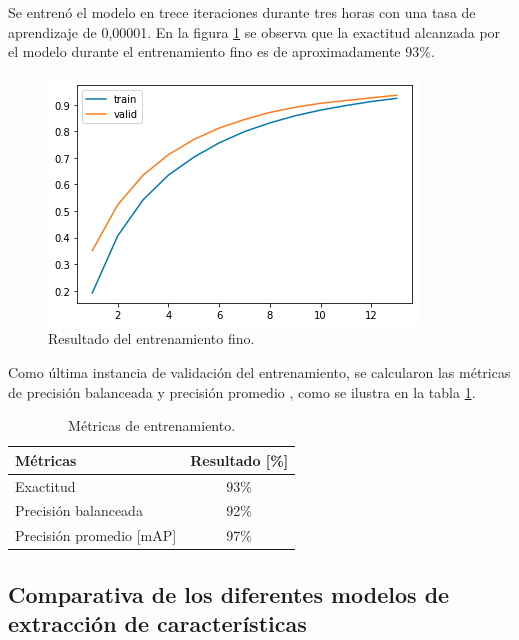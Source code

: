 Se entrenó el modelo en trece iteraciones durante tres horas con una tasa de aprendizaje de 0,00001. En la figura \ref{fig:entrenamientoFinoResultado} se observa que la exactitud alcanzada por el modelo durante el entrenamiento fino es de aproximadamente 93\%.

\begin{figure}[ht]
	\centering
	\includegraphics[scale=1.]{./Figures/entrenamientoFinoResultado.png}
	\caption{Resultado del entrenamiento fino.}
	\label{fig:entrenamientoFinoResultado}
\end{figure}

Como última instancia de validación del entrenamiento, se calcularon las métricas de precisión balanceada \citep{BalancedAccuracy} y precisión promedio \citep{mAP}, como se ilustra en la tabla \ref{tab:metricasEntrenamiento}.

\begin{table}[h]
	\centering
	\caption[Métrica Entrenamiento]{Métricas de entrenamiento.}
	\begin{tabular}{l c}    
		\toprule
		\textbf{Métricas}   & \textbf{Resultado [\%]} \\
		\midrule
		Exactitud & 93\% \\
		Precisión balanceada & 92\% \\
		Precisión promedio [mAP] & 97\% \\
		\bottomrule
		\hline
	\end{tabular}
	\label{tab:metricasEntrenamiento}
\end{table}

\newpage

\subsection{Comparativa de los diferentes modelos de extracción de características}
\label{sec:comparativaExtractores}

